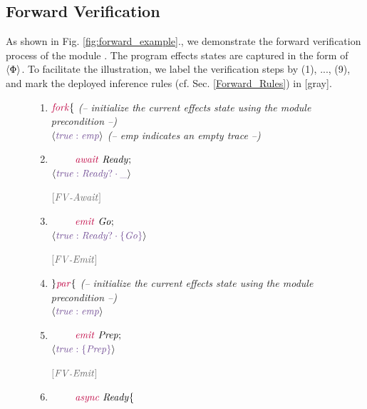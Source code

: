 \documentclass[acmsmall,10pt,review]{acmart}
\newcommand{\key}[1]{\textcolor{purple}{\code{#1}}}
\newcommand{\siderule}[1]{
\code{\footnotesize{\textcolor{mGray}{#1}}}}
\newcommand{\effect}{\textcolor{black}{\ensuremath{\mathrm{\Phi}}}}
\newcommand{\code}[1]{{\tt{\ensuremath{\m{#1}}}}}
\newcommand{\m}{\mathit}
\newcommand\figref[1]{Fig. \textcolor{black}{\ref{#1}}.}
\newcommand\secref[1]{Sec. \textcolor{black}{\ref{#1}}}
\begin{document}
\subsection{Forward Verification}
As shown in \figref{fig:forward_example}, we demonstrate the forward verification process of the module  {}. The program effects states  are captured in the form of \code{\langle \textcolor{huntergreen}{\effect} \rangle}. To facilitate the illustration, we label the verification steps by (1), ..., (9), and mark the deployed inference rules (cf. \secref{Forward_Rules}) in \textcolor{mGray}{[gray]}.

{
\begin{figure}[ht]
      \vspace{0mm}
     \begin{minipage}[c]{\columnwidth}
      \vspace{0mm}
         \centering
         {\small
\begin{enumerate}
  \item  \code{\key{fork}\{    } 
                 \textcolor{mGray}{  \emph{(– initialize the current effects state using the module precondition –)}}
  \\
 \code{\langle  \textcolor{darklavender}{true : emp} \rangle }
                  \textcolor{mGray}{  \emph{(– emp indicates an empty trace –)}}
  \item    \code{~\qquad \key{await}\ Ready;}
   \\
 \code{\langle  \textcolor{darklavender}{true : Ready? \cdot\_ } \rangle }
     \siderule{ [FV\text{-}Await]}
     \\
   \item    \code{~\qquad \key{emit}\ Go;}
         \\
 \code{\langle  \textcolor{darklavender}{true : Ready? \cdot\{Go\}} \rangle }
     \siderule{ [FV\text{-}Emit]}
     \\
  \item \code{ \} \key{par}\{ }
       \textcolor{mGray}{  \emph{(– initialize the current effects state using the module precondition –)}}
  \\
 \code{\langle  \textcolor{darklavender}{true : emp} \rangle }
  \item    \code{~\qquad \key{emit}\ Prep; }
     \\
 \code{\langle  \textcolor{darklavender}{true : \{Prep\}} \rangle }
     \siderule{ [FV\text{-}Emit]}
     \\
  \item    \code{~\qquad \key{async}\ Ready\{}

\end{enumerate}}
\end{minipage}
\end{figure}}
\end{document}
